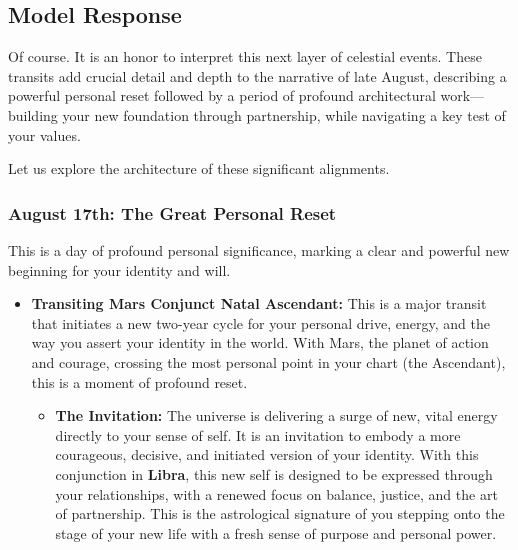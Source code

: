 \documentclass{article}
\begin{document}
\subsection*{Model Response}\label{model-response}

Of course. It is an honor to interpret this next layer of celestial events. These transits add crucial detail and depth to the narrative of late August, describing a powerful personal reset followed by a period of profound architectural work---building your new foundation through partnership, while navigating a key test of your values.

Let us explore the architecture of these significant alignments.

\subsubsection*{August 17th: The Great Personal Reset}\label{august-17th-the-great-personal-reset}

This is a day of profound personal significance, marking a clear and powerful new beginning for your identity and will.

\begin{itemize}
\tightlist
\item
  \textbf{Transiting Mars Conjunct Natal Ascendant:} This is a major transit that initiates a new two-year cycle for your personal drive, energy, and the way you assert your identity in the world. With Mars, the planet of action and courage, crossing the most personal point in your chart (the Ascendant), this is a moment of profound reset.

  \begin{itemize}
  \tightlist
  \item
    \textbf{The Invitation:} The universe is delivering a surge of new, vital energy directly to your sense of self. It is an invitation to embody a more courageous, decisive, and initiated version of your identity. With this conjunction in \textbf{Libra}, this new self is designed to be expressed through your relationships, with a renewed focus on balance, justice, and the art of partnership. This is the astrological signature of you stepping onto the stage of your new life with a fresh sense of purpose and personal power.
  \end{itemize}
\end{itemize}
\end{document}
